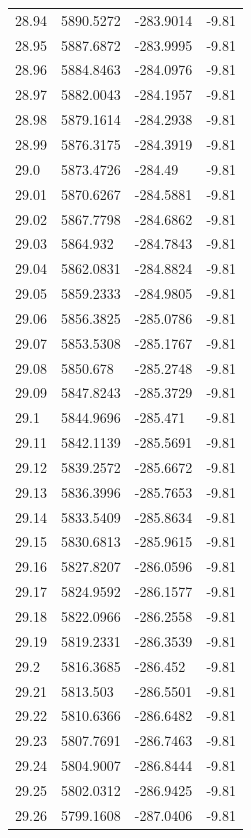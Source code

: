 \begin{table}[H]
\begin{tabular}{llll}
28.94 & 5890.5272 & -283.9014 & -9.81 \\
28.95 & 5887.6872 & -283.9995 & -9.81 \\
28.96 & 5884.8463 & -284.0976 & -9.81 \\
28.97 & 5882.0043 & -284.1957 & -9.81 \\
28.98 & 5879.1614 & -284.2938 & -9.81 \\
28.99 & 5876.3175 & -284.3919 & -9.81 \\
29.0 & 5873.4726 & -284.49 & -9.81 \\
29.01 & 5870.6267 & -284.5881 & -9.81 \\
29.02 & 5867.7798 & -284.6862 & -9.81 \\
29.03 & 5864.932 & -284.7843 & -9.81 \\
29.04 & 5862.0831 & -284.8824 & -9.81 \\
29.05 & 5859.2333 & -284.9805 & -9.81 \\
29.06 & 5856.3825 & -285.0786 & -9.81 \\
29.07 & 5853.5308 & -285.1767 & -9.81 \\
29.08 & 5850.678 & -285.2748 & -9.81 \\
29.09 & 5847.8243 & -285.3729 & -9.81 \\
29.1 & 5844.9696 & -285.471 & -9.81 \\
29.11 & 5842.1139 & -285.5691 & -9.81 \\
29.12 & 5839.2572 & -285.6672 & -9.81 \\
29.13 & 5836.3996 & -285.7653 & -9.81 \\
29.14 & 5833.5409 & -285.8634 & -9.81 \\
29.15 & 5830.6813 & -285.9615 & -9.81 \\
29.16 & 5827.8207 & -286.0596 & -9.81 \\
29.17 & 5824.9592 & -286.1577 & -9.81 \\
29.18 & 5822.0966 & -286.2558 & -9.81 \\
29.19 & 5819.2331 & -286.3539 & -9.81 \\
29.2 & 5816.3685 & -286.452 & -9.81 \\
29.21 & 5813.503 & -286.5501 & -9.81 \\
29.22 & 5810.6366 & -286.6482 & -9.81 \\
29.23 & 5807.7691 & -286.7463 & -9.81 \\
29.24 & 5804.9007 & -286.8444 & -9.81 \\
29.25 & 5802.0312 & -286.9425 & -9.81 \\
29.26 & 5799.1608 & -287.0406 & -9.81 \\

\end{tabular}
\end{table}
